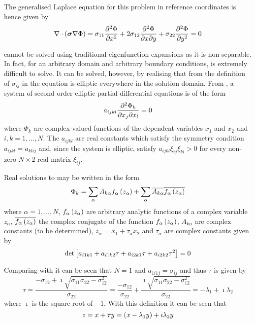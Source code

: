 The generalised Laplace equation for this problem in reference coordinates is
hence given by
\begin{equation}
  \divergence{}{\pbrac{\tensor{\sigma}\gradient{}\Phi}}=\sigma_{11}\deltwosqby{\Phi}
  {x}+2\sigma_{12}\deltwoby{\Phi}{x}{y}+\sigma_{22}\deltwosqby{\Phi}{y}
  =0
  \label{eqn:2DrcgenLaplace}
\end{equation}

 cannot be solved using traditional eigenfunction
expansions as it is non-separable. In fact, for an arbitrary domain and
arbitrary boundary conditions,  is extremely
difficult to solve. It can be solved, however, by realising that from the
definition of $\sigma_{ij}$ in  the
equation is elliptic everywhere in the solution domain. From
, a system of second order elliptic partial
differential equations is of the form
\begin{equation}
  a_{ijkl}\deltwoby{\Phi_{k}}{x_{j}}{x_{l}}=0
  \label{eqn:general2ndorderellipticpde}
\end{equation}
where $\Phi_{k}$ are complex-valued functions of the dependent variables
$x_{1}$ and $x_{2}$ and $i,k=1,\ldots,N$. The $a_{ijkl}$ are real constants
which satisfy the symmetry condition $a_{ijkl}=a_{klij}$ and, since the system
is elliptic, satisfy $a_{ijkl}\xi_{ij}\xi_{kl}>0$ for every non-zero $N\times
2$ real matrix $\xi_{ij}$.

Real solutions to  may be written in
the form 
\begin{equation}
  \Phi_{k}= \displaystyle\sum _{\alpha}A_{k\alpha} f_{\alpha}\left( z_{\alpha} \right) +
   \displaystyle\sum _{\alpha}\overline{A_{k\alpha}}\overline{ f_{\alpha}\left( z_{\alpha} \right) }
\end{equation}
where $\alpha=1,\hdots,N$, $ f_{\alpha}\left( z_{\alpha} \right) $ are arbitrary
analytic functions of a complex variable $z_{\alpha}$,
$\overline{ f_{\alpha}\left( z_{\alpha} \right) }$ the complex conjugate of the
function $ f_{\alpha}\left( z_{\alpha} \right) $, $A_{k\alpha}$ are complex constants
(to be determined), $z_{\alpha}=x_{1}+\tau_{\alpha} x_{2}$ and $\tau_{\alpha}$
are complex constants given by
\begin{equation}
  \det\left[ a_{i1k1}+a_{i1k2}\tau+a_{i2k1}\tau+a_{i2k2}\tau^{2} \right]=0
\end{equation}

Comparing  with
 it can be seen that $N=1$ and
$a_{1i1j}=\sigma_{ij}$ and thus $\tau$ is given by
\begin{equation}
  \tau=\dfrac{-\sigma_{12}+\imath\sqrt{\sigma_{11}\sigma_{22}-\sigma_{12}^{2}}}
  {\sigma_{22}}=\dfrac{-\sigma_{12}}{\sigma_{22}}+\dfrac{\imath\sqrt{
      \sigma_{11}\sigma_{22}-\sigma_{12}^{2}}}{\sigma_{22}}=-\lambda_{1}+
  \imath\lambda_{2}
\end{equation}
where $\imath$ is the square root of $-1$. With this definition it can be seen
that
\begin{equation}
  z=x+\tau y=\left( x-\lambda_{1}y \right)+\imath\lambda_{2}y
\end{equation}

